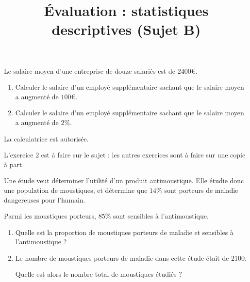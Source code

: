 \documentclass[
	classe=$2^{de}$,
	headerTitle=Évaluation\space Chapitre\space 4
]{évaluation}
\begin{document}
\begin{exercice}[3]
	Le salaire moyen d'une entreprise de douze salariés est de $2400€$.
	\begin{enumerate}
		\item Calculer le salaire d’un employé supplémentaire sachant que le salaire moyen a augmenté de $100€$. 
		\item Calculer le salaire d’un employé supplémentaire sachant que le salaire moyen a augmenté de $2\%$. 
	\end{enumerate}
\end{exercice}

\newpage
\title{Évaluation : statistiques descriptives (Sujet B)}
\setcounter{exercice}{1}

\maketitle

\begin{tcolorbox}
	La calculatrice est autorisée.

	L'exercice 2 est à faire sur le sujet : les autres exercices sont à faire sur une copie à part.
\end{tcolorbox}

\begin{exercice}[2]

	Une étude veut déterminer l'utilité d'un produit antimoustique. Elle étudie donc une population de moustiques, et détermine que $14\%$ sont porteurs de maladie dangereuses pour l'humain.

	Parmi les moustiques porteurs, $85\%$ sont sensibles à l'antimoustique.

	\begin{enumerate}
		\item Quelle est la proportion de moustiques porteurs de maladie et sensibles à l'antimoustique ? 
		\item Le nombre de moustiques porteurs de maladie dans cette étude était de $2100$.

		      Quelle est alors le nombre total de moustiques étudiés ? 
	\end{enumerate}
\end{exercice}
\end{document}
